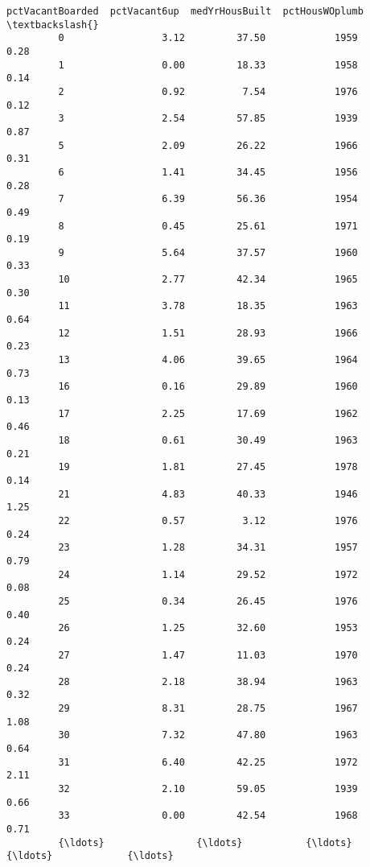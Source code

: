 \documentclass[11pt]{llncs}
\begin{document}
\begin{Verbatim}[commandchars=\\\{\}]
               pctVacantBoarded  pctVacant6up  medYrHousBuilt  pctHousWOplumb  \textbackslash{}
         0                 3.12         37.50            1959            0.28   
         1                 0.00         18.33            1958            0.14   
         2                 0.92          7.54            1976            0.12   
         3                 2.54         57.85            1939            0.87   
         5                 2.09         26.22            1966            0.31   
         6                 1.41         34.45            1956            0.28   
         7                 6.39         56.36            1954            0.49   
         8                 0.45         25.61            1971            0.19   
         9                 5.64         37.57            1960            0.33   
         10                2.77         42.34            1965            0.30   
         11                3.78         18.35            1963            0.64   
         12                1.51         28.93            1966            0.23   
         13                4.06         39.65            1964            0.73   
         16                0.16         29.89            1960            0.13   
         17                2.25         17.69            1962            0.46   
         18                0.61         30.49            1963            0.21   
         19                1.81         27.45            1978            0.14   
         21                4.83         40.33            1946            1.25   
         22                0.57          3.12            1976            0.24   
         23                1.28         34.31            1957            0.79   
         24                1.14         29.52            1972            0.08   
         25                0.34         26.45            1976            0.40   
         26                1.25         32.60            1953            0.24   
         27                1.47         11.03            1970            0.24   
         28                2.18         38.94            1963            0.32   
         29                8.31         28.75            1967            1.08   
         30                7.32         47.80            1963            0.64   
         31                6.40         42.25            1972            2.11   
         32                2.10         59.05            1939            0.66   
         33                0.00         42.54            1968            0.71   
         {\ldots}                {\ldots}           {\ldots}             {\ldots}             {\ldots}   

\end{Verbatim}
\end{document}
